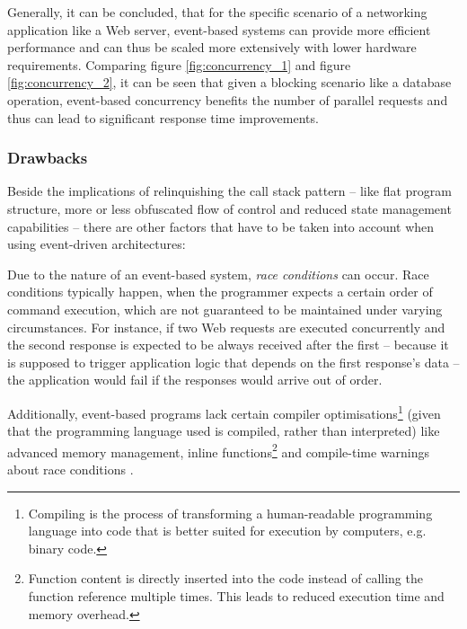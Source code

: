 Generally, it can be concluded, that for the specific scenario of a networking application like a Web server, event-based systems can provide more efficient performance and can thus be scaled more extensively with lower hardware requirements. Comparing figure \ref{fig:concurrency_1} and figure \ref{fig:concurrency_2}, it can be seen that given a blocking scenario like a database operation, event-based concurrency benefits the number of parallel requests and thus can lead to significant response time improvements.

\subsubsection*{Drawbacks}
Beside the implications of relinquishing the call stack pattern -- like flat program structure, more or less obfuscated flow of control and reduced state management capabilities -- there are other factors that have to be taken into account when using event-driven architectures: 

Due to the nature of an event-based system, \textit{race conditions} can occur. Race conditions typically happen, when the programmer expects a certain order of command execution, which are not guaranteed to be maintained under varying circumstances. For instance, if two Web requests are executed concurrently and the second response is expected to be always received after the first -- because it is supposed to trigger application logic that depends on the first response's data -- the application would fail if the responses would arrive out of order.

Additionally, event-based programs lack certain compiler optimisations\footnote{Compiling is the process of transforming a human-readable programming language into code that is better suited for execution by computers, e.g. binary code.} (given that the programming language used is compiled, rather than interpreted) like advanced memory management, inline functions\footnote{Function content is directly inserted into the code instead of calling the function reference multiple times. This leads to reduced execution time and memory overhead.} and compile-time warnings about race conditions \cite[p. 5]{Behren2003}.


